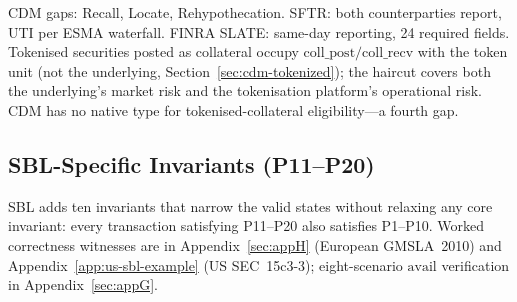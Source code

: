 CDM gaps: Recall, Locate, Rehypothecation. SFTR: both counterparties report, UTI per ESMA waterfall. FINRA SLATE: same-day reporting, 24 required fields. Tokenised securities posted as collateral occupy $\mathrm{coll\_post}/\mathrm{coll\_recv}$ with the token unit (not the underlying, Section~\ref{sec:cdm-tokenized}); the haircut covers both the underlying's market risk and the tokenisation platform's operational risk. CDM has no native type for tokenised-collateral eligibility---a fourth gap.

\subsection{SBL-Specific Invariants (P11--P20)}
\label{sec:sbl-invariants}

SBL adds ten invariants that narrow the valid states without relaxing any core invariant: every transaction satisfying P11--P20 also satisfies P1--P10. Worked correctness witnesses are in Appendix~\ref{sec:appH} (European GMSLA~2010) and Appendix~\ref{app:us-sbl-example} (US SEC~15c3-3); eight-scenario $\mathrm{avail}$ verification in Appendix~\ref{sec:appG}.

